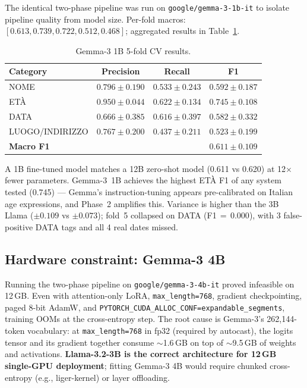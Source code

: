 \documentclass[11pt,a4paper]{article}
\begin{document}
The identical two-phase pipeline was run on \texttt{google/gemma-3-1b-it} to isolate pipeline quality from model size. Per-fold macros: $[0.613, 0.739, 0.722, 0.512, 0.468]$; aggregated results in Table~\ref{tab:gemma1b}.

\begin{table}[h]
\centering
\caption{Gemma-3 1B 5-fold CV results.}
\label{tab:gemma1b}
\begin{tabular}{lccc}
\toprule
Category & Precision & Recall & F1 \\
\midrule
NOME              & $0.796 \pm 0.190$ & $0.533 \pm 0.243$ & $0.592 \pm 0.187$ \\
ETÀ               & $0.950 \pm 0.044$ & $0.622 \pm 0.134$ & $\mathbf{0.745 \pm 0.108}$ \\
DATA              & $0.666 \pm 0.385$ & $0.616 \pm 0.397$ & $0.582 \pm 0.332$ \\
LUOGO/INDIRIZZO   & $0.767 \pm 0.200$ & $0.437 \pm 0.211$ & $0.523 \pm 0.199$ \\
\midrule
\textbf{Macro F1} & & & $\mathbf{0.611 \pm 0.109}$ \\
\bottomrule
\end{tabular}
\end{table}

A 1B fine-tuned model matches a 12B zero-shot model (0.611 vs 0.620) at 12$\times$ fewer parameters. Gemma-3~1B achieves the highest ETÀ F1 of any system tested (0.745) — Gemma's instruction-tuning appears pre-calibrated on Italian age expressions, and Phase~2 amplifies this. Variance is higher than the 3B Llama ($\pm 0.109$ vs $\pm 0.073$); fold~5 collapsed on DATA (F1$\,=\,0.000$), with 3 false-positive DATA tags and all 4 real dates missed.

\subsection{Hardware constraint: Gemma-3 4B}

Running the two-phase pipeline on \texttt{google/gemma-3-4b-it} proved infeasible on 12\,GB. Even with attention-only LoRA, \texttt{max\_length=768}, gradient checkpointing, paged 8-bit AdamW, and \texttt{PYTORCH\_CUDA\_ALLOC\_CONF=expandable\_segments}, training OOMs at the cross-entropy step. The root cause is Gemma-3's 262{,}144-token vocabulary: at \texttt{max\_length=768} in fp32 (required by autocast), the logits tensor and its gradient together consume $\sim$1.6\,GB on top of $\sim$9.5\,GB of weights and activations. \textbf{Llama-3.2-3B is the correct architecture for 12\,GB single-GPU deployment}; fitting Gemma-3 4B would require chunked cross-entropy (e.g., liger-kernel) or layer offloading.
\end{document}

